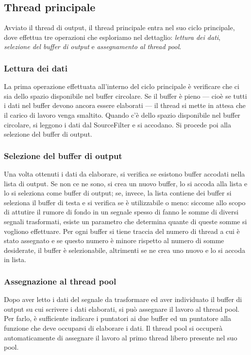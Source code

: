 \subsection{Thread principale}
\label{main_thread}
Avviato il thread di output, il thread principale entra nel suo ciclo
principale, dove effettua tre operazioni che esploriamo nel dettaglio:
\emph{lettura dei dati}, \emph{selezione del buffer di output} e
\emph{assegnamento al thread pool}.
\subsubsection{Lettura dei dati}
La prima operazione effettuata all'interno del ciclo principale \`e verificare
che ci sia dello spazio disponibile nel buffer circolare. Se il buffer \`e
pieno --- cio\`e se tutti i dati nel buffer devono ancora essere elaborati ---
il thread si mette in attesa che il carico di lavoro venga smaltito. Quando
c'\`e dello spazio disponibile nel buffer circolare, si leggono i dati
dal SourceFilter e si accodano. Si procede poi alla selezione del buffer di
output.
\subsubsection{Selezione del buffer di output}
Una volta ottenuti i dati da elaborare, si verifica se esistono buffer accodati
nella lista di output. Se non ce ne sono, si crea un nuovo buffer, lo si accoda
alla lista e lo si seleziona come buffer di output; se, invece, la lista
contiene dei buffer si seleziona il buffer di testa e si verifica se \`e
utilizzabile o meno: siccome allo scopo di attutire il rumore di fondo in un
segnale spesso di fanno le somme di diversi segnali trasformati, esiste un
parametro che determina quante di queste somme si vogliono effettuare. Per ogni
buffer si tiene traccia del numero di thread a cui \`e stato assegnato e se
questo numero \`e minore rispetto al numero di somme desiderate, il buffer \`e
selezionabile, altrimenti se ne crea uno nuovo e lo si accoda in lista.
\subsubsection{Assegnazione al thread pool}
Dopo aver letto i dati del segnale da trasformare ed aver individuato il buffer
di output su cui scrivere i dati elaborati, si può assegnare il lavoro al thread
pool. Per farlo, \`e sufficiente indicare i puntatori ai due buffer ed un
puntatore alla funzione che deve occuparsi di elaborare i dati. Il thread pool
si occuper\`a automaticamente di assegnare il lavoro al primo thread libero
presente nel suo pool.
